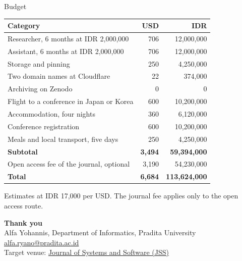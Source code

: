 \documentclass[aspectratio=169, table, 12pt]{beamer}
\begin{document}
\begin{frame}{{\Large Budget}}
  \vspace{13pt}
  {\centering\footnotesize
  \renewcommand{\arraystretch}{1.05}
  \begin{tabular}{@{}lrr@{}}
    \toprule
    \textbf{Category} & \textbf{USD} & \textbf{IDR} \\
    \midrule
    Researcher, 6 months at IDR 2,000,000 & 706 & 12,000,000 \\
    Assistant, 6 months at IDR 2,000,000 & 706 & 12,000,000 \\
    Storage and pinning & 250 & 4,250,000 \\
    Two domain names at Cloudflare & 22 & 374,000 \\
    Archiving on Zenodo & 0 & 0 \\
    Flight to a conference in Japan or Korea & 600 & 10,200,000 \\
    Accommodation, four nights & 360 & 6,120,000 \\
    Conference registration & 600 & 10,200,000 \\
    Meals and local transport, five days & 250 & 4,250,000 \\
    \midrule
    \textbf{Subtotal} & \textbf{3,494} & \textbf{59,394,000} \\
    Open access fee of the journal, optional & 3,190 & 54,230,000 \\
    \textbf{Total} & \textbf{6,684} & \textbf{113,624,000} \\
    \bottomrule
  \end{tabular}\par}
  \vspace{4pt}
  {\tiny\centering Estimates at IDR 17,000 per USD. The journal fee applies only
  to the open access route.\par}
\end{frame}

\begin{frame}{\hfill}
  \centering
  \Huge{\textbf{Thank you}}\\[18pt]
  \normalsize Alfa Yohannis, Department of Informatics, Pradita University\\[4pt]
  \href{mailto:alfa.ryano@pradita.ac.id}{alfa.ryano@pradita.ac.id}\\[10pt]
  \small Target venue:
  \href{https://www.sciencedirect.com/journal/journal-of-systems-and-software}{Journal of Systems and Software (JSS)}
\end{frame}
\end{document}
